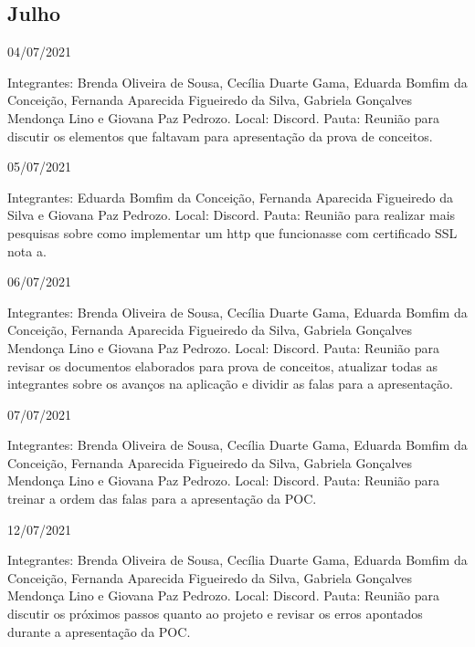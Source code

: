 \begin{apendicesenv}
\begin{flushleft}
 \section{Julho}
 04/07/2021 

Integrantes: Brenda Oliveira de Sousa, Cecília Duarte Gama, Eduarda Bomfim da Conceição, Fernanda Aparecida Figueiredo da Silva, Gabriela Gonçalves Mendonça Lino e Giovana Paz Pedrozo.
\newline
Local: \gls{Discord}.
\newline
Pauta: Reunião para discutir os elementos que faltavam para apresentação da prova de conceitos.

05/07/2021

Integrantes: Eduarda Bomfim da Conceição, Fernanda Aparecida Figueiredo da Silva e Giovana Paz Pedrozo.
\newline
Local: \gls{Discord}.
\newline
Pauta: Reunião para realizar mais pesquisas sobre como implementar um http que funcionasse com certificado \ac{SSL} nota a.

06/07/2021 

Integrantes: Brenda Oliveira de Sousa, Cecília Duarte Gama, Eduarda Bomfim da Conceição, Fernanda Aparecida Figueiredo da Silva, Gabriela Gonçalves Mendonça Lino e Giovana Paz Pedrozo.
\newline
Local: \gls{Discord}.
\newline
Pauta: Reunião para revisar os documentos elaborados para prova de conceitos, atualizar todas as integrantes sobre os avanços na aplicação e dividir as falas para a apresentação.

07/07/2021

Integrantes: Brenda Oliveira de Sousa, Cecília Duarte Gama, Eduarda Bomfim da Conceição, Fernanda Aparecida Figueiredo da Silva, Gabriela Gonçalves Mendonça Lino e Giovana Paz Pedrozo.
\newline
Local: \gls{Discord}.
\newline
Pauta: Reunião para treinar a ordem das falas para a apresentação da \ac{POC}.

12/07/2021 

Integrantes: Brenda Oliveira de Sousa, Cecília Duarte Gama, Eduarda Bomfim da Conceição, Fernanda Aparecida Figueiredo da Silva, Gabriela Gonçalves Mendonça Lino e Giovana Paz Pedrozo.
\newline
Local: \gls{Discord}.
\newline
Pauta: Reunião para discutir os próximos passos quanto ao projeto e revisar os erros apontados durante a apresentação da \ac{POC}.


\end{flushleft}
\end{apendicesenv}
